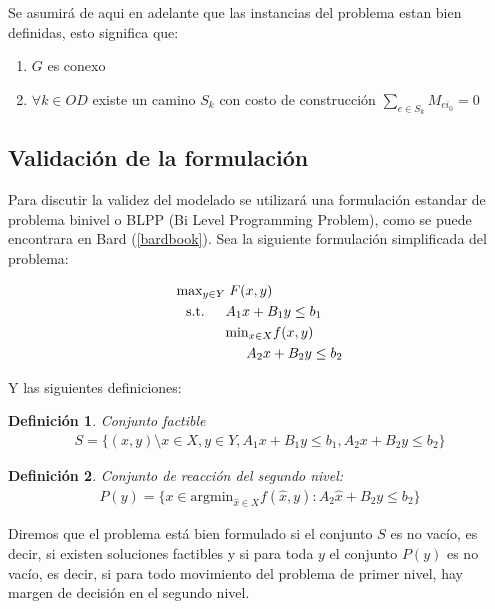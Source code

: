 \documentclass{article}
\newtheorem{definition}{Definición}
\newcommand{\modelspace}{\hspace{1.5em}}
\begin{document}
  Se asumirá de aqui en adelante que las instancias del problema estan bien definidas, esto significa que:

  \begin{enumerate}
    \item {$G$ es conexo}
    \item {$\forall k \in OD$ existe un camino $S_k$ con costo de construcción $\sum_{e \in S_k} M_{ei_0} = 0$}
  \end{enumerate}

  \subsection*{Validación de la formulación}

  Para discutir la validez del modelado se utilizará una formulación estandar de problema binivel o BLPP (Bi Level Programming Problem), como se puede encontrara en Bard (\ref{bardbook}).
  Sea la siguiente formulación simplificada del problema:

  \begin{align}
    \text{max}_{y \in Y}    & \; F(x, y) \\
    \text{s.t.} \modelspace & A_1 x + B_1 y \leq b_1 \\
                            & \text{min}_{x \in X} f(x, y) \\
                            & \modelspace A_2 x + B_2 y \leq b_2
  \end{align}

  Y las siguientes definiciones:

  \begin{definition}
    Conjunto factible
    \begin{align}
      S = \{(x, y) \setminus x \in X, y \in Y, A_1 x + B_1 y \leq b_1, A_2 x + B_2 y \leq b_2 \}
    \end{align}
  \end{definition}

  \begin{definition}
    Conjunto de reacción del segundo nivel:
    \begin{align}
      P(y) = \{ x \in \text{argmin}_{\hat{x} \in X} f(\hat{x}, y) : A_2 \hat{x} + B_2 y \leq b_2 \}
    \end{align}
  \end{definition}

  Diremos que el problema está bien formulado si el conjunto $S$ es no vacío, es decir, si existen soluciones factibles y si para toda $y$ el conjunto $P(y)$ es no vacío, es decir, si para todo movimiento del problema de primer nivel, hay margen de decisión en el segundo nivel.
\end{document}
